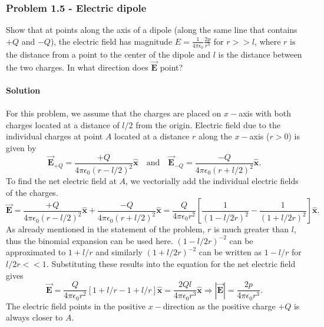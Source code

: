 \documentclass{article}
\begin{document}
\subsubsection*{Problem 1.5 - Electric dipole}
Show that at points along the axis of a dipole (along the same line that contains $+Q$ and $-Q$), the electric
field has magnitude $E=\frac{1}{4\pi\epsilon_0}\frac{2p}{r^3}$ for $r>>l$, where $r$ is the distance from a point to the center of the dipole and $l$ is the distance between the two charges.
In what direction does $\Vec{\boldsymbol{E}}$ point? 
\\
\\\textbf{Solution}
\\
\\For this problem, we assume that the charges are placed on $x-$axis with both charges located at a distance of $l/2$ from the origin. Electric field due to the individual charges at point $A$ located at a distance $r$ along the $x-$axis ($r>0$) is given by
\[\Vec{\boldsymbol{E}}_{+Q}=\frac{+Q}{4\pi\epsilon_0(r-l/2)^2}\boldsymbol{\hat{x}}\,\,\,\,\,\,\text{and}\,\,\,\,\,\,\Vec{\boldsymbol{E}}_{-Q}=\frac{-Q}{4\pi\epsilon_0(r+l/2)^2}\boldsymbol{\hat{x}}.\]
To find the net electric field at $A$, we vectorially add the individual electric fields of the charges.
\[\Vec{\boldsymbol{E}}=\frac{+Q}{4\pi\epsilon_0(r-l/2)^2}\boldsymbol{\hat{x}}+\frac{-Q}{4\pi\epsilon_0(r+l/2)^2}\boldsymbol{\hat{x}}=\frac{Q}{4\pi\epsilon_0r^2}\left[\frac{1}{(1-l/2r)^2}-\frac{1}{(1+l/2r)^2}\right]\boldsymbol{\hat{x}}.\]
As already mentioned in the statement of the problem, $r$ is much greater than $l$, thus the binomial expansion can be used here. $(1-l/2r)^{-2}$ can be approximated to $1+l/r$ and similarly $(1+l/2r)^{-2}$ can be written as $1-l/r$ for $l/2r<<1$. Substituting these results into the equation for the net electric field gives
\[\Vec{\boldsymbol{E}}=\frac{Q}{4\pi\epsilon_0r^2}\left[1+l/r-1+l/r\right]\boldsymbol{\hat{x}}=\frac{2Ql}{4\pi\epsilon_0r^3}\boldsymbol{\hat{x}}\Rightarrow|\Vec{\boldsymbol{E}}|=\frac{2p}{4\pi\epsilon_0r^3}.\]
The electric field points in the positive $x-$direction as the positive charge $+Q$ is always closer to $A$.
\end{document}

